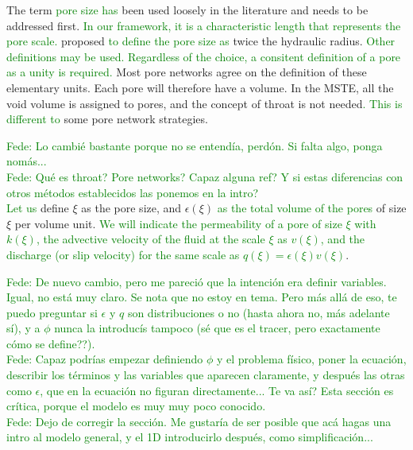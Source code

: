 \documentclass{CFD2011}
\newcommand{\Fede}[1]{\textcolor{green}{Fede: #1} \\}
\newcommand{\newf}[1]{\textcolor{green}{#1}}
\newcommand{\nof}[1]{\textcolor{cyan}{}}
\begin{document}
The term \nof{pore-size have}\newf{pore size has} been used loosely in the literature and needs to be addressed first. \newf{In our framework, it is a characteristic length that represents the pore scale. }\cite{Dullien} proposed \nof{to use}\newf{to define the pore size as} twice the hydraulic radius\nof{as a convenient definition but others might work as well in the present approach since what we are after is a characteristic length that will represent the pore scale}. \nof{Any of these choices requires a proper definition of a pore as a unity, for which any arbitrary definition of a portion of the void volume can chosen where a pore size can be measure (e.g. hydraulic radius) for each pore.}\newf{Other definitions may be used. Regardless of the choice, a consitent definition of a pore as a unity is required.} Most pore networks agree on the definition of these elementary units. Each pore will therefore have a volume. In the MSTE, all the void volume is assigned to pores, and the concept of throat \citep{oren2002, blunt2002, piri2005} is not needed\newf{. This is different to} \nof{making a difference with }some pore network strategies. 

\Fede{Lo cambi\'e bastante porque no se entend\'ia, perd\'on. Si falta algo, ponga nom\'as...}
\Fede{Qu\'e es throat? Pore networks? Capaz alguna ref? Y si estas diferencias con otros m\'etodos establecidos las ponemos en la intro?}

\nof{Let's}\newf{Let us} define $\xi$ as the pore size, and $\epsilon(\xi)$ \newf{as the total volume of the pores} \nof{the summed volume for all the pores }of size $\xi$ per volume unit.
\nof{On average, the permeability will be different for each pore size as well, $k(\xi)$. A driven force will produce an advective velocity of the fluid at the scale $\xi$ denoted as $v(\xi)$, and the discharge (or slip velocity) for the same scale is $q(\xi)=\epsilon(\xi) v(\xi)$.}
\newf{We will indicate the permeability of a pore of size $\xi$ with $k(\xi)$, the advective velocity of the fluid at the scale $\xi$ as $v(\xi)$, and the discharge (or slip velocity) for the same scale as $q(\xi)=\epsilon(\xi) v(\xi)$}.

\Fede{De nuevo cambio, pero me pareci\'o que la intenci\'on era definir variables. Igual, no est\'a muy claro. Se nota que no estoy en tema. Pero m\'as all\'a de eso, te puedo preguntar si $\epsilon$ y $q$ son distribuciones o no (hasta ahora no, m\'as adelante s\'i), y a $\phi$ nunca la introduc\'is tampoco (s\'e que es el tracer, pero exactamente c\'omo se define??).}
\Fede{Capaz podr\'ias empezar definiendo $\phi$ y el problema f\'isico, poner la ecuaci\'on, describir los t\'erminos y las variables que aparecen claramente, y despu\'es las otras como $\epsilon$, que en la ecuaci\'on no figuran directamente... Te va as\'i? Esta secci\'on es cr\'itica, porque el modelo es muy muy poco conocido.}
\Fede{Dejo de corregir la secci\'on. Me gustar\'ia de ser posible que ac\'a hagas una intro al modelo general, y el 1D introducirlo despu\'es, como simplificaci\'on... }
\end{document}
